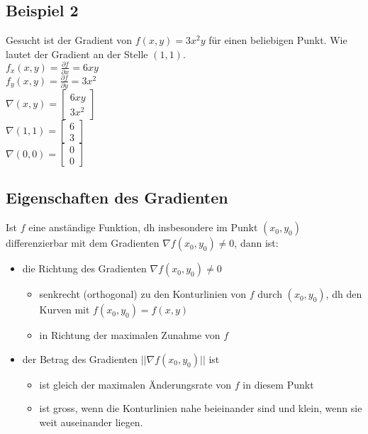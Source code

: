 \documentclass[../main.tex]{subfiles}
\begin{document}
\subsection{Beispiel 2}
Gesucht ist der Gradient von $f(x,y)=3x^2y$ für einen beliebigen Punkt. Wie lautet der Gradient an der Stelle $(1,1)$. \\ [7pt]
$f_x(x,y)=\frac{\partial f}{\partial x}=6xy$ \\ [7pt]
$f_y(x,y)=\frac{\partial f}{\partial y}=3x^2$ \\ [7pt]
$\nabla (x,y)=\begin{bmatrix}6xy \\3x^2\end{bmatrix}$ \\ [7pt]
$\nabla (1,1)=\begin{bmatrix}6 \\3\end{bmatrix}$ \\ [7pt]
$\nabla (0,0)=\begin{bmatrix}0 \\0\end{bmatrix}$

\subsection{Eigenschaften des Gradienten}
Ist $f$ eine anständige Funktion, dh insbesondere im Punkt $(x_0,y_0)$ differenzierbar mit dem 
Gradienten $\nabla f(x_0,y_0)\neq 0$, dann ist: \\
\begin{itemize}
    \item die Richtung des Gradienten $\nabla f(x_0,y_0)\neq 0$
    \begin{itemize}
        \item senkrecht (orthogonal) zu den Konturlinien von $f$ durch $(x_0,y_0)$, dh den Kurven mit $f(x_0,y_0)=f(x,y)$
        \item in Richtung der maximalen Zunahme von $f$
    \end{itemize}
    \item der Betrag des Gradienten $||\nabla f(x_0,y_0)||$ ist
    \begin{itemize}
        \item ist gleich der maximalen Änderungsrate von $f$ in diesem Punkt
        \item ist gross, wenn die Konturlinien nahe beieinander sind und klein, wenn sie weit auseinander liegen.
    \end{itemize}
\end{itemize}
\end{document}
